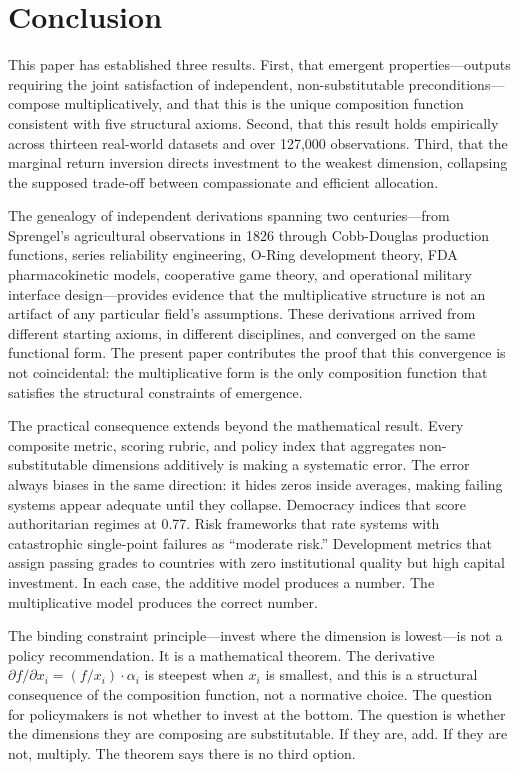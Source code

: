 \documentclass[12pt, a4paper]{article}
\theoremstyle{definition}
\theoremstyle{remark}
\begin{document}
\section{Conclusion}\label{sec:conclusion}

This paper has established three results. First, that emergent properties---outputs requiring the joint satisfaction of independent, non-substitutable preconditions---compose multiplicatively, and that this is the unique composition function consistent with five structural axioms. Second, that this result holds empirically across thirteen real-world datasets and over 127,000 observations. Third, that the marginal return inversion directs investment to the weakest dimension, collapsing the supposed trade-off between compassionate and efficient allocation.

The genealogy of independent derivations spanning two centuries---from Sprengel's agricultural observations in 1826 through Cobb-Douglas production functions, series reliability engineering, O-Ring development theory, FDA pharmacokinetic models, cooperative game theory, and operational military interface design---provides evidence that the multiplicative structure is not an artifact of any particular field's assumptions. These derivations arrived from different starting axioms, in different disciplines, and converged on the same functional form. The present paper contributes the proof that this convergence is not coincidental: the multiplicative form is the only composition function that satisfies the structural constraints of emergence.

The practical consequence extends beyond the mathematical result. Every composite metric, scoring rubric, and policy index that aggregates non-substitutable dimensions additively is making a systematic error. The error always biases in the same direction: it hides zeros inside averages, making failing systems appear adequate until they collapse. Democracy indices that score authoritarian regimes at 0.77. Risk frameworks that rate systems with catastrophic single-point failures as ``moderate risk.'' Development metrics that assign passing grades to countries with zero institutional quality but high capital investment. In each case, the additive model produces a number. The multiplicative model produces the correct number.

The binding constraint principle---invest where the dimension is lowest---is not a policy recommendation. It is a mathematical theorem. The derivative $\partial f / \partial x_i = (f / x_i) \cdot \alpha_i$ is steepest when $x_i$ is smallest, and this is a structural consequence of the composition function, not a normative choice. The question for policymakers is not whether to invest at the bottom. The question is whether the dimensions they are composing are substitutable. If they are, add. If they are not, multiply. The theorem says there is no third option.
\end{document}
